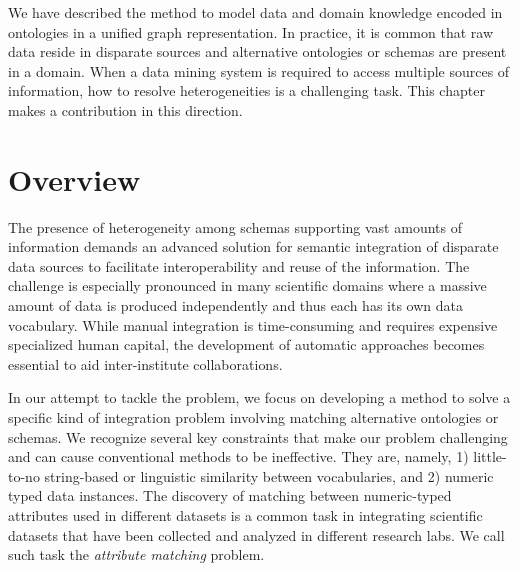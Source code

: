 We have described the method to model data and domain knowledge encoded in ontologies in a unified graph representation. In practice, it is common that raw data reside in disparate sources and alternative ontologies or schemas are present in a domain. When a data mining system is required to access multiple sources of information, how to resolve heterogeneities is a challenging task. This chapter makes a contribution in this direction.

\section{Overview}
The presence of heterogeneity among schemas supporting vast amounts of information demands an advanced solution for semantic integration of disparate data sources to facilitate interoperability and reuse of the information. The challenge is especially pronounced in many scientific domains where a massive amount of data is produced independently and thus each has its own data vocabulary. While manual integration is time-consuming and requires expensive specialized human capital, the development of automatic approaches becomes essential to aid inter-institute collaborations.

In our attempt to tackle the problem, we focus on developing a method to solve a specific kind of integration problem involving matching alternative ontologies or schemas. We recognize several key constraints that make our problem challenging and can cause conventional methods to be ineffective. They are, namely, 1) little-to-no string-based or linguistic similarity between vocabularies, and 2) numeric typed data instances. The discovery of matching between numeric-typed attributes used in different datasets is a common task in integrating scientific datasets that have been collected and analyzed in different research labs. We call such task the \emph{attribute matching} problem.

